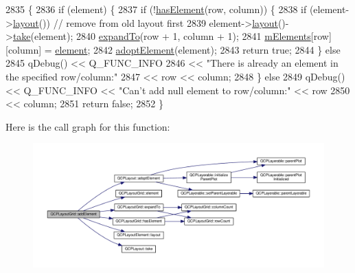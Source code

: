 \begin{DoxyCode}
2835                                                                              \{
2836   \textcolor{keywordflow}{if} (element) \{
2837     \textcolor{keywordflow}{if} (!\hyperlink{class_q_c_p_layout_grid_ab0cf4f7edc9414a3bfaddac0f46dc0a0}{hasElement}(row, column)) \{
2838       \textcolor{keywordflow}{if} (element->\hyperlink{class_q_c_p_layout_element_a6235f5384db871fc6e3387a1bc558b0d}{layout}()) \textcolor{comment}{// remove from old layout first}
2839         element->\hyperlink{class_q_c_p_layout_element_a6235f5384db871fc6e3387a1bc558b0d}{layout}()->\hyperlink{class_q_c_p_layout_ada26cd17e56472b0b4d7fbbc96873e4c}{take}(element);
2840       \hyperlink{class_q_c_p_layout_grid_a886c0dcbabd51a45da399e044552b685}{expandTo}(row + 1, column + 1);
2841       \hyperlink{class_q_c_p_layout_grid_a2ec4664bcfb5d479255e50f0c074f7c9}{mElements}[row][column] = \hyperlink{class_q_c_p_layout_grid_a525f25e6ba43ee228151d074251b4e6a}{element};
2842       \hyperlink{class_q_c_p_layout_af6dbbc24156a808da29cd1ec031729a3}{adoptElement}(element);
2843       \textcolor{keywordflow}{return} \textcolor{keyword}{true};
2844     \} \textcolor{keywordflow}{else}
2845       qDebug() << Q\_FUNC\_INFO
2846                << \textcolor{stringliteral}{"There is already an element in the specified row/column:"}
2847                << row << column;
2848   \} \textcolor{keywordflow}{else}
2849     qDebug() << Q\_FUNC\_INFO << \textcolor{stringliteral}{"Can't add null element to row/column:"} << row
2850              << column;
2851   \textcolor{keywordflow}{return} \textcolor{keyword}{false};
2852 \}
\end{DoxyCode}


Here is the call graph for this function\+:\nopagebreak
\begin{figure}[H]
\begin{center}
\leavevmode
\includegraphics[width=350pt]{class_q_c_p_layout_grid_adff1a2ca691ed83d2d24a4cd1fe17012_cgraph}
\end{center}
\end{figure}




